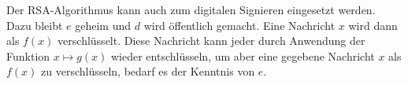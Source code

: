 Der RSA-Algorithmus kann auch zum digitalen Signieren eingesetzt werden.  Dazu bleibt $e$ geheim und
$d$ wird öffentlich gemacht. Eine Nachricht $x$ wird dann als $f(x)$ verschlüsselt.  Diese Nachricht kann
jeder durch Anwendung der Funktion $x \mapsto g(x)$ wieder entschlüsseln, um aber eine gegebene Nachricht
$x$ als $f(x)$ zu verschlüsseln, bedarf es der Kenntnis von $e$.

